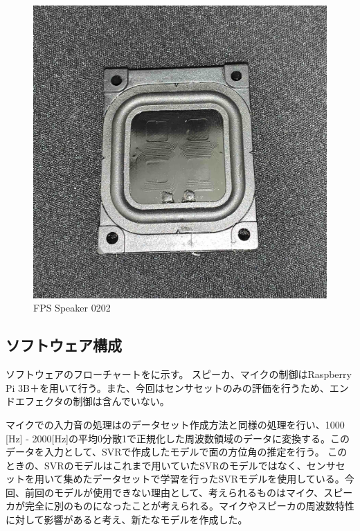 \begin{figure}[tb]
  \begin{center}
  \vspace{1zh}
    \includegraphics[width=0.7\linewidth]{images/5_fps0202.jpg}   
  \end{center}
  \caption{FPS Speaker 0202}
  \label{fig:hand_hard_fps}
\end{figure}


\subsection{ソフトウェア構成}
\label{sec:soft_system}
ソフトウェアのフローチャートをに示す。
スピーカ、マイクの制御はRaspberry Pi 3B＋を用いて行う。また、今回はセンサセットのみの評価を行うため、エンドエフェクタの制御は含んでいない。

マイクでの入力音の処理はのデータセット作成方法と同様の処理を行い、1000 [Hz] - 2000[Hz]の平均0分散1で正規化した周波数領域のデータに変換する。このデータを入力として、SVRで作成したモデルで面の方位角の推定を行う。
このときの、SVRのモデルはこれまで用いていたSVRのモデルではなく、センサセットを用いて集めたデータセットで学習を行ったSVRモデルを使用している。今回、前回のモデルが使用できない理由として、考えられるものはマイク、スピーカが完全に別のものになったことが考えられる。マイクやスピーカの周波数特性に対して影響があると考え、新たなモデルを作成した。

